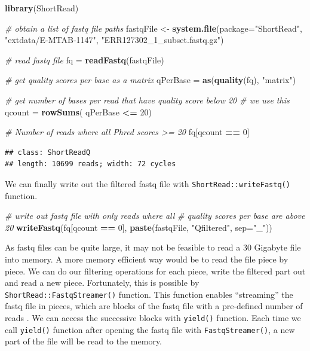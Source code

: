 \documentclass[12pt,]{krantz}
\newenvironment{Shaded}{\begin{snugshade}}{\end{snugshade}}
\newcommand{\CommentTok}[1]{\textcolor[rgb]{0.56,0.35,0.01}{\textit{#1}}}
\newcommand{\DataTypeTok}[1]{\textcolor[rgb]{0.13,0.29,0.53}{#1}}
\newcommand{\DecValTok}[1]{\textcolor[rgb]{0.00,0.00,0.81}{#1}}
\newcommand{\KeywordTok}[1]{\textcolor[rgb]{0.13,0.29,0.53}{\textbf{#1}}}
\newcommand{\NormalTok}[1]{#1}
\newcommand{\OperatorTok}[1]{\textcolor[rgb]{0.81,0.36,0.00}{\textbf{#1}}}
\newcommand{\StringTok}[1]{\textcolor[rgb]{0.31,0.60,0.02}{#1}}
\begin{document}
\begin{Shaded}
\begin{Highlighting}[]
\KeywordTok{library}\NormalTok{(ShortRead)}

\CommentTok{# obtain a list of fastq file paths}
\NormalTok{fastqFile <-}\StringTok{ }\KeywordTok{system.file}\NormalTok{(}\DataTypeTok{package=}\StringTok{"ShortRead"}\NormalTok{,}
                          \StringTok{"extdata/E-MTAB-1147"}\NormalTok{,}
                          \StringTok{"ERR127302_1_subset.fastq.gz"}\NormalTok{)}

\CommentTok{# read fastq file}
\NormalTok{fq =}\StringTok{ }\KeywordTok{readFastq}\NormalTok{(fastqFile)}

\CommentTok{# get quality scores per base as a matrix}
\NormalTok{qPerBase =}\StringTok{ }\KeywordTok{as}\NormalTok{(}\KeywordTok{quality}\NormalTok{(fq), }\StringTok{"matrix"}\NormalTok{)}

\CommentTok{# get number of bases per read that have quality score below 20}
\CommentTok{# we use this}
\NormalTok{qcount =}\StringTok{ }\KeywordTok{rowSums}\NormalTok{( qPerBase }\OperatorTok{<=}\StringTok{ }\DecValTok{20}\NormalTok{) }

\CommentTok{# Number of reads where all Phred scores >= 20}
\NormalTok{fq[qcount }\OperatorTok{==}\StringTok{ }\DecValTok{0}\NormalTok{]}
\end{Highlighting}
\end{Shaded}

\begin{verbatim}
## class: ShortReadQ
## length: 10699 reads; width: 72 cycles
\end{verbatim}

We can finally write out the filtered fastq file with \texttt{ShortRead::writeFastq()} function.

\begin{Shaded}
\begin{Highlighting}[]
\CommentTok{# write out fastq file with only reads where all }
\CommentTok{# quality scores per base are above 20}
\KeywordTok{writeFastq}\NormalTok{(fq[qcount }\OperatorTok{==}\StringTok{ }\DecValTok{0}\NormalTok{], }
           \KeywordTok{paste}\NormalTok{(fastqFile, }\StringTok{"Qfiltered"}\NormalTok{, }\DataTypeTok{sep=}\StringTok{"_"}\NormalTok{))}
\end{Highlighting}
\end{Shaded}

As fastq files can be quite large, it may not be feasible to read a 30 Gigabyte file into memory. A more memory efficient way would be to read the file piece by piece. We can do our filtering operations for each piece, write the filtered part out and read a new piece. Fortunately, this is possible by \texttt{ShortRead::FastqStreamer()} function. This function enables ``streaming'' the fastq file in pieces, which are blocks of the fastq file with a pre-defined number of reads . We can access the successive blocks with \texttt{yield()} function. Each time we call \texttt{yield()} function after opening the fastq file with \texttt{FastqStreamer()}, a new part of the file will be read to the memory.
\end{document}
